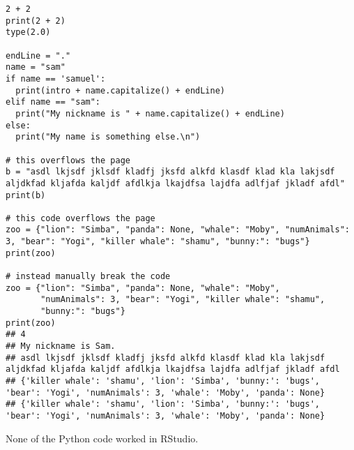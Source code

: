 \documentclass{article}\usepackage{graphicx, color}
\makeatletter
\newenvironment{kframe}{%
 \def\at@end@of@kframe{}%
 \ifinner\ifhmode%
  \def\at@end@of@kframe{\end{minipage}}%
  \begin{minipage}{\columnwidth}%
 \fi\fi%
 \def\FrameCommand##1{\hskip\@totalleftmargin \hskip-\fboxsep
 \colorbox{shadecolor}{##1}\hskip-\fboxsep
     \hskip-\linewidth \hskip-\@totalleftmargin \hskip\columnwidth}%
 \MakeFramed {\advance\hsize-\width
   \@totalleftmargin\z@ \linewidth\hsize
   \@setminipage}}%
 {\par\unskip\endMakeFramed%
 \at@end@of@kframe}
\newenvironment{knitrout}{}{} %
\makeatother
\begin{document}
\begin{knitrout}
\color{fgcolor}\begin{kframe}
\begin{verbatim}
2 + 2
print(2 + 2)
type(2.0)

endLine = "."
name = "sam"
if name == 'samuel':
  print(intro + name.capitalize() + endLine)
elif name == "sam":
  print("My nickname is " + name.capitalize() + endLine)
else:
  print("My name is something else.\n")

# this overflows the page
b = "asdl lkjsdf jklsdf kladfj jksfd alkfd klasdf klad kla lakjsdf aljdkfad kljafda kaljdf afdlkja lkajdfsa lajdfa adlfjaf jkladf afdl"
print(b)

# this code overflows the page
zoo = {"lion": "Simba", "panda": None, "whale": "Moby", "numAnimals": 3, "bear": "Yogi", "killer whale": "shamu", "bunny:": "bugs"}
print(zoo)

# instead manually break the code
zoo = {"lion": "Simba", "panda": None, "whale": "Moby", 
       "numAnimals": 3, "bear": "Yogi", "killer whale": "shamu", 
       "bunny:": "bugs"}
print(zoo)
## 4
## My nickname is Sam.
## asdl lkjsdf jklsdf kladfj jksfd alkfd klasdf klad kla lakjsdf aljdkfad kljafda kaljdf afdlkja lkajdfsa lajdfa adlfjaf jkladf afdl
## {'killer whale': 'shamu', 'lion': 'Simba', 'bunny:': 'bugs', 'bear': 'Yogi', 'numAnimals': 3, 'whale': 'Moby', 'panda': None}
## {'killer whale': 'shamu', 'lion': 'Simba', 'bunny:': 'bugs', 'bear': 'Yogi', 'numAnimals': 3, 'whale': 'Moby', 'panda': None}
\end{verbatim}
\end{kframe}
\end{knitrout}



None of the Python code worked in RStudio.
\end{document}
